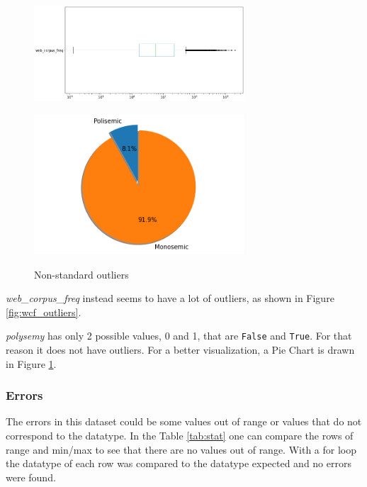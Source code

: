 \documentclass[a4paper,11pt,dvipsnames]{article}
\begin{document}
\begin{figure}[h]
\begin{minipage}[b]{.58\linewidth}
    \centering
    \includegraphics[width=0.7\textwidth]{Graphs/wcf_outliers.png}
    \label{fig:wcf_outliers}
    \end{minipage}\hfill
    \begin{minipage}[b]{.38\linewidth}
    \centering
    \includegraphics[width=0.7\textwidth]{Graphs/piechart.png}
    \label{fig:pie}
    \end{minipage}
    \caption{Non-standard outliers}
    
\end{figure}

\textit{web\_corpus\_freq} instead seems to have a lot of outliers, as shown in Figure \ref{fig:wcf_outliers}.

\textit{polysemy} has only 2 possible values, 0 and 1, that are \texttt{False} and \texttt{True}. For that reason it does not have outliers. For a better visualization, a Pie Chart is drawn in Figure \ref{fig:pie}.



\subsubsection{Errors}
The errors in this dataset could be some values out of range or values that do not correspond to the datatype. In the Table \ref{tab:stat} one can compare the rows of range and min/max to see that there are no values out of range. With a for loop the datatype of each row was compared to the datatype expected and no errors were found.
\end{document}

